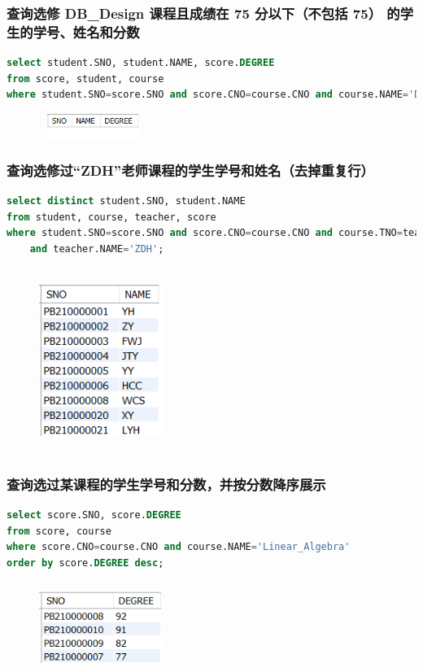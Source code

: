 \documentclass{ctexart}
\begin{document}
\subsubsection{查询选修 DB\_Design 课程且成绩在 75 分以下（不包括 75） 的学生的学号、姓名和分数}
\begin{lstlisting}[language=sql]
select student.SNO, student.NAME, score.DEGREE
from score, student, course
where student.SNO=score.SNO and score.CNO=course.CNO and course.NAME='DB_Design' and score.DEGREE<75;	
\end{lstlisting}
\begin{figure}[H]
	\centering 
	\includegraphics[height=0.8cm,width=3.5cm]{30.png}
	\end{figure}
\subsubsection{查询选修过“ZDH”老师课程的学生学号和姓名（去掉重复行）}
\begin{lstlisting}[language=sql]
select distinct student.SNO, student.NAME
from student, course, teacher, score
where student.SNO=score.SNO and score.CNO=course.CNO and course.TNO=teacher.TNO 
	and teacher.NAME='ZDH';	
\end{lstlisting}
\begin{figure}[H]
	\centering 
	\includegraphics[height=6cm,width=4cm]{31.png}
	\end{figure}
\subsubsection{查询选过某课程的学生学号和分数，并按分数降序展示}
\begin{lstlisting}[language=sql]
select score.SNO, score.DEGREE
from score, course
where score.CNO=course.CNO and course.NAME='Linear_Algebra'
order by score.DEGREE desc;
\end{lstlisting}
\begin{figure}[H]
	\centering 
	\includegraphics[height=3cm,width=4cm]{32.png}
	\end{figure}
\end{document}
